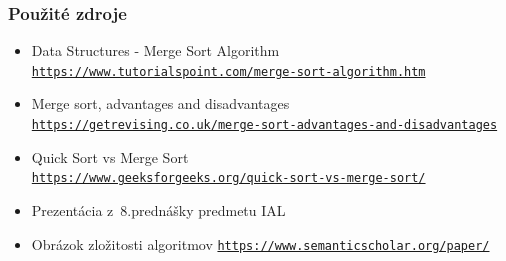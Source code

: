 \documentclass[10pt,xcolor=pdflatex,hyperref={unicode}]{beamer}
\begin{document}
\begin{frame}
\frametitle{Použité zdroje}
\begin{itemize}
    \item Data Structures - Merge Sort Algorithm \\
    \href{https://www.tutorialspoint.com/data_structures_algorithms/merge_sort_algorithm.htm}{\scriptsize\texttt{https://www.tutorialspoint.com/merge-sort-algorithm.htm}}
    \item Merge sort, advantages and disadvantages \\
    \href{https://getrevising.co.uk/grids/merge-sort-advantages-and-disadvantages}{\scriptsize\texttt{https://getrevising.co.uk/merge-sort-advantages-and-disadvantages}}
    \item Quick Sort vs Merge Sort\\
    \href{https://www.geeksforgeeks.org/quick-sort-vs-merge-sort/}{\scriptsize\texttt{https://www.geeksforgeeks.org/quick-sort-vs-merge-sort/}}
    \item Prezentácia z~8.prednášky predmetu IAL
    \item Obrázok zložitosti algoritmov
    \href{https://www.semanticscholar.org/paper/An-efficient-hardware-implementation-of-odd-even-Korat-Yadav/6538996857d08bc96d73ef6f3db1f3f54599a074/figure/5}{\scriptsize\texttt{https://www.semanticscholar.org/paper/}}
\end{itemize}
\end{frame}
\end{document}
